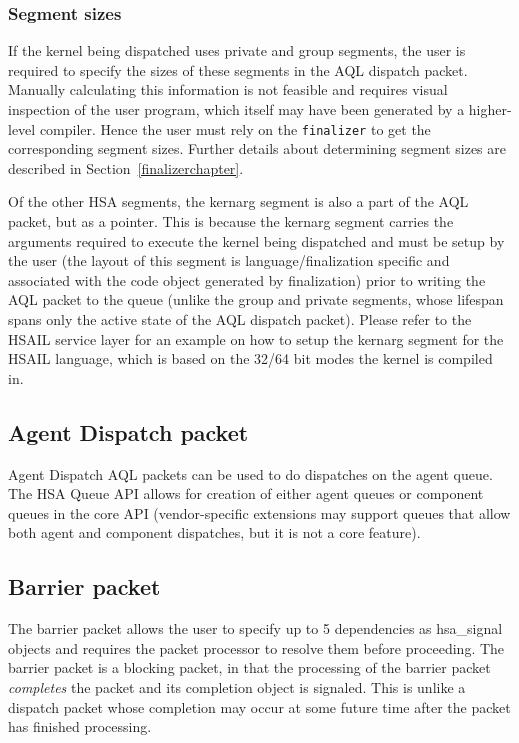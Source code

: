 \documentclass[draft]{book}
\newcommand{\reftyp}[1]{#1}
\begin{document}
\hypertarget{segment-sizes}{}\subsubsection{Segment sizes}
\label{segment-sizes}

If the kernel being dispatched uses private and group segments, the user is
required to specify the sizes of these segments in the AQL dispatch
packet. Manually calculating this information is not feasible and requires
visual inspection of the user program, which itself may have been generated by a
higher-level compiler. Hence the user must rely on the \texttt{finalizer} to get
the corresponding segment sizes. Further details about determining segment sizes
are described in Section~\ref{finalizerchapter}.

Of the other HSA segments, the kernarg segment is also a part of the AQL packet,
but as a pointer. This is because the kernarg segment carries the arguments
required to execute the kernel being dispatched and must be setup by the user
(the layout of this segment is language/finalization specific and associated
with the code object generated by finalization) prior to writing the AQL packet
to the queue (unlike the group and private segments, whose lifespan spans only
the active state of the AQL dispatch packet). Please refer to the HSAIL service
layer for an example on how to setup the kernarg segment for the HSAIL language,
which is based on the 32/64 bit modes the kernel is compiled in.

\hypertarget{agent-packet}{}\subsection{Agent Dispatch packet}
\label{agent-packet}

Agent Dispatch AQL packets can be used to do dispatches on the agent queue. The
HSA Queue API allows for creation of either agent queues or component queues in
the core API (vendor-specific extensions may support queues that allow both
agent and component dispatches, but it is not a core feature).

\hypertarget{barrier-packet}{}\subsection{Barrier packet}
\label{barrier-packet}

The barrier packet allows the user to specify up to 5 dependencies as
\reftyp{hsa_signal} objects and requires the packet processor to resolve them
before proceeding. The barrier packet is a blocking packet, in that the
processing of the barrier packet \emph{completes} the packet and its completion
object is signaled. This is unlike a dispatch packet whose completion may occur
at some future time after the packet has finished processing.
\end{document}
